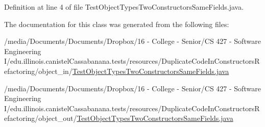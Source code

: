 Definition at line 4 of file TestObjectTypesTwoConstructorsSameFields.java.



The documentation for this class was generated from the following files:\begin{DoxyCompactItemize}
\item 
/media/Documents/Documents/Dropbox/16 -\/ College -\/ Senior/CS 427 -\/ Software Engineering I/edu.illinois.canistelCassabanana.tests/resources/DuplicateCodeInConstructorsRefactoring/object\_\-in/\hyperlink{object__in_2TestObjectTypesTwoConstructorsSameFields_8java}{TestObjectTypesTwoConstructorsSameFields.java}\item 
/media/Documents/Documents/Dropbox/16 -\/ College -\/ Senior/CS 427 -\/ Software Engineering I/edu.illinois.canistelCassabanana.tests/resources/DuplicateCodeInConstructorsRefactoring/object\_\-out/\hyperlink{object__out_2TestObjectTypesTwoConstructorsSameFields_8java}{TestObjectTypesTwoConstructorsSameFields.java}\end{DoxyCompactItemize}
